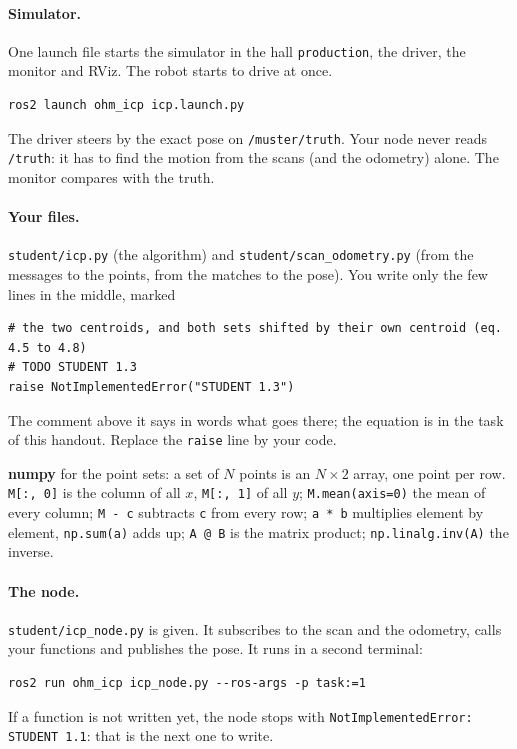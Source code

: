 \documentclass[11pt,a4paper,parskip=half]{scrartcl}
\newcommand{\thema}[1]{\texttt{#1}}
\newcommand{\datei}[1]{\texttt{#1}}
\begin{document}
\paragraph{Simulator.} One launch file starts the simulator in the hall \thema{production}, the driver, the
monitor and RViz. The robot starts to drive at once.
\begin{lstlisting}
ros2 launch ohm_icp icp.launch.py
\end{lstlisting}
The driver steers by the exact pose on \thema{/muster/truth}. Your node never reads \thema{/truth}: it has
to find the motion from the scans (and the odometry) alone. The monitor compares with the truth.

\paragraph{Your files.} \datei{student/icp.py} (the algorithm) and \datei{student/scan\_odometry.py} (from
the messages to the points, from the matches to the pose). You write only the few lines in the middle, marked
\begin{lstlisting}
# the two centroids, and both sets shifted by their own centroid (eq. 4.5 to 4.8)
# TODO STUDENT 1.3
raise NotImplementedError("STUDENT 1.3")
\end{lstlisting}
The comment above it says in words what goes there; the equation is in the task of this handout. Replace the
\thema{raise} line by your code.

\begin{note}
\textbf{numpy} for the point sets: a set of \(N\) points is an \(N\times2\) array, one point per row.
\thema{M[:, 0]} is the column of all \(x\), \thema{M[:, 1]} of all \(y\); \thema{M.mean(axis=0)} the mean
of every column; \thema{M - c} subtracts \thema{c} from every row; \thema{a * b} multiplies element by
element, \thema{np.sum(a)} adds up; \thema{A @ B} is the matrix product; \thema{np.linalg.inv(A)} the
inverse.
\end{note}

\paragraph{The node.} \datei{student/icp\_node.py} is given. It subscribes to the scan and the odometry,
calls your functions and publishes the pose. It runs in a second terminal:
\begin{lstlisting}
ros2 run ohm_icp icp_node.py --ros-args -p task:=1
\end{lstlisting}
If a function is not written yet, the node stops with \thema{NotImplementedError: STUDENT 1.1}: that is the
next one to write.
\end{document}
